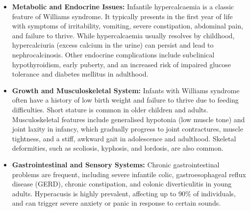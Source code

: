 \begin{itemize}
    \item \textbf{Metabolic and Endocrine Issues:} Infantile hypercalcaemia is a classic feature of Williams syndrome. It typically presents in the first year of life with symptoms of irritability, vomiting, severe constipation, abdominal pain, and failure to thrive. While hypercalcaemia usually resolves by childhood, hypercalciuria (excess calcium in the urine) can persist and lead to nephrocalcinosis. Other endocrine complications include subclinical hypothyroidism, early puberty, and an increased risk of impaired glucose tolerance and diabetes mellitus in adulthood.
    \item \textbf{Growth and Musculoskeletal System:} Infants with Williams syndrome often have a history of low birth weight and failure to thrive due to feeding difficulties. Short stature is common in older children and adults. Musculoskeletal features include generalised hypotonia (low muscle tone) and joint laxity in infancy, which gradually progress to joint contractures, muscle tightness, and a stiff, awkward gait in adolescence and adulthood. Skeletal deformities, such as scoliosis, kyphosis, and lordosis, are also common.
    \item \textbf{Gastrointestinal and Sensory Systems:} Chronic gastrointestinal problems are frequent, including severe infantile colic, gastroesophageal reflux disease (GERD), chronic constipation, and colonic diverticulitis in young adults. Hyperacusis is highly prevalent, affecting up to 90\% of individuals, and can trigger severe anxiety or panic in response to certain sounds.
\end{itemize}

